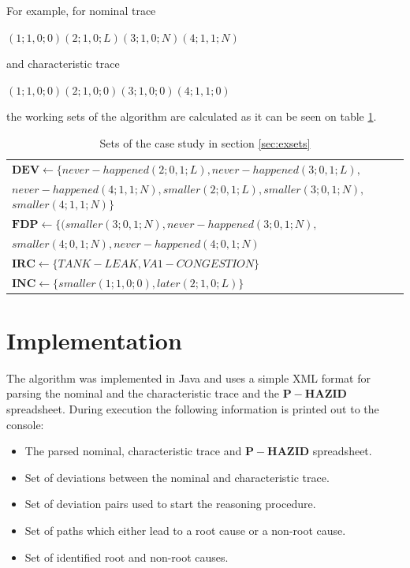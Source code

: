 \documentclass[conference]{IEEEtran}
\begin{document}
For example, for nominal trace 

$(1;1,0;0) (2;1,0;L) (3;1,0;N) (4;1,1;N)$

and characteristic trace 

$(1;1,0;0) (2;1,0;0) (3;1,0;0) (4;1,1;0)$

the working sets of the algorithm are calculated as it can be seen on table \ref{tbl:algVariables}.

\begin{table}
\centering
\label{tbl:algVariables}
\begin{tabular}{p{12cm}}
\hline
   $\mathbf{DEV} \leftarrow \{ never-happened(2;0,1;L),never-happened(3;0,1;L),$ \\ 
   $never-happened(4;1,1;N),smaller(2;0,1;L),smaller(3;0,1;N),$
   $smaller(4;1,1;N) \}$ \\
   $\mathbf{FDP} \leftarrow \{ (smaller(3;0,1;N),never-happened(3;0,1;N),$\\
   $smaller(4;0,1;N),never-happened(4;0,1;N) $ \\   

   $\mathbf{IRC} \leftarrow \{ TANK-LEAK, VA1-CONGESTION \}$ \\
   $\mathbf{INC} \leftarrow \{ smaller(1;1,0;0),later(2;1,0;L)\}$ \\
\hline
\end{tabular}
\caption{Sets of the case study in section \ref{sec:exsets} }
\end{table}

\section{Implementation}
The algorithm was implemented in Java and uses a simple XML format for parsing the nominal and the characteristic trace and the $\mathbf{P-HAZID}$ spreadsheet. During execution the following information is printed out to the console:

\begin{itemize}
\item The parsed nominal, characteristic trace and $\mathbf{P-HAZID}$ spreadsheet.
\item Set of deviations between the nominal and characteristic trace.
\item Set of deviation pairs used to start the reasoning procedure.
\item Set of paths which either lead to a root cause or a non-root cause.
\item Set of identified root and non-root causes.
\end{itemize}
\end{document}
